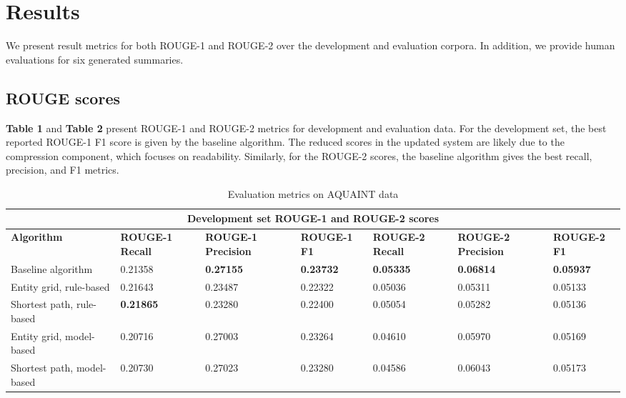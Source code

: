 \documentclass[11pt]{article}
\begin{document}
\section{Results}
We present result metrics for both ROUGE-1 and ROUGE-2 over the development and evaluation corpora. In addition, we provide human evaluations for six generated summaries. 

\subsection{ROUGE scores}
\textbf{Table 1} and \textbf{Table 2} present ROUGE-1 and ROUGE-2 metrics for development and evaluation data. For the development set, the best reported  ROUGE-1 F1 score is given by the baseline algorithm. The reduced scores in the updated system are likely due to the compression component, which focuses on readability. Similarly, for the ROUGE-2 scores, the baseline algorithm gives the best recall, precision, and F1 metrics.

\begin{table}[h]
\begin{tabular}{|p{4.3cm}||p{1.735cm}|p{1.78cm}|p{1.735cm}|p{1.735cm}|p{1.78cm}|p{1.735cm}| }
 \hline
 \multicolumn{7}{|c|}{Development set ROUGE-1 and ROUGE-2 scores} \\
 \hline
 \textbf{Algorithm} & \textbf{ROUGE-1 Recall} & \textbf{ROUGE-1 Precision} & \textbf{ROUGE-1 F1} & \textbf{ROUGE-2 Recall} & \textbf{ROUGE-2 Precision} & \textbf{ROUGE-2 F1}\\
 \hline
Baseline algorithm & 0.21358 & \textbf{0.27155} & \textbf{0.23732} & \textbf{0.05335} & \textbf{0.06814} & \textbf{0.05937} \\ 
Entity grid, rule-based & 0.21643 & 0.23487 & 0.22322 & 0.05036 & 0.05311 & 0.05133 \\
Shortest path, rule-based & \textbf{0.21865} & 0.23280 & 0.22400 & 0.05054 & 0.05282 & 0.05136 \\
Entity grid, model-based & 0.20716 & 0.27003 & 0.23264 & 0.04610 & 0.05970 & 0.05169 \\
Shortest path, model-based & 0.20730 & 0.27023 & 0.23280 & 0.04586 & 0.06043 & 0.05173 \\
\hline
\end{tabular}
\caption{Evaluation metrics on AQUAINT data}
\label{tab:dev} 
\end{table}
\end{document}
